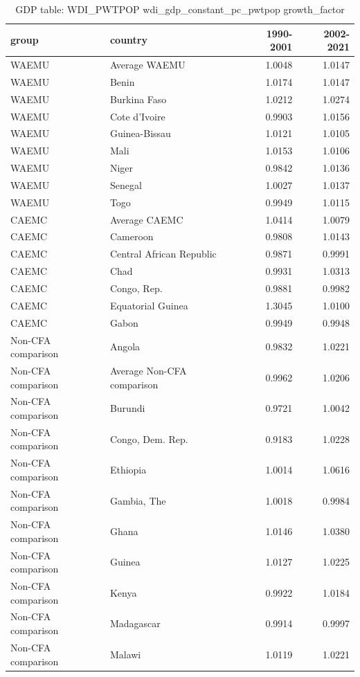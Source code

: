 \begin{table}

\caption{GDP table: WDI_PWTPOP wdi_gdp_constant_pc_pwtpop growth_factor}
\centering
\begin{tabular}[t]{llrr}
\toprule
group & country & 1990-2001 & 2002-2021\\
\midrule
WAEMU & Average WAEMU & 1.0048 & 1.0147\\
WAEMU & Benin & 1.0174 & 1.0147\\
WAEMU & Burkina Faso & 1.0212 & 1.0274\\
WAEMU & Cote d'Ivoire & 0.9903 & 1.0156\\
WAEMU & Guinea-Bissau & 1.0121 & 1.0105\\
\addlinespace
WAEMU & Mali & 1.0153 & 1.0106\\
WAEMU & Niger & 0.9842 & 1.0136\\
WAEMU & Senegal & 1.0027 & 1.0137\\
WAEMU & Togo & 0.9949 & 1.0115\\
CAEMC & Average CAEMC & 1.0414 & 1.0079\\
\addlinespace
CAEMC & Cameroon & 0.9808 & 1.0143\\
CAEMC & Central African Republic & 0.9871 & 0.9991\\
CAEMC & Chad & 0.9931 & 1.0313\\
CAEMC & Congo, Rep. & 0.9881 & 0.9982\\
CAEMC & Equatorial Guinea & 1.3045 & 1.0100\\
\addlinespace
CAEMC & Gabon & 0.9949 & 0.9948\\
Non-CFA comparison & Angola & 0.9832 & 1.0221\\
Non-CFA comparison & Average Non-CFA comparison & 0.9962 & 1.0206\\
Non-CFA comparison & Burundi & 0.9721 & 1.0042\\
Non-CFA comparison & Congo, Dem. Rep. & 0.9183 & 1.0228\\
\addlinespace
Non-CFA comparison & Ethiopia & 1.0014 & 1.0616\\
Non-CFA comparison & Gambia, The & 1.0018 & 0.9984\\
Non-CFA comparison & Ghana & 1.0146 & 1.0380\\
Non-CFA comparison & Guinea & 1.0127 & 1.0225\\
Non-CFA comparison & Kenya & 0.9922 & 1.0184\\
\addlinespace
Non-CFA comparison & Madagascar & 0.9914 & 0.9997\\
Non-CFA comparison & Malawi & 1.0119 & 1.0221\\

\end{tabular}
\end{table}
